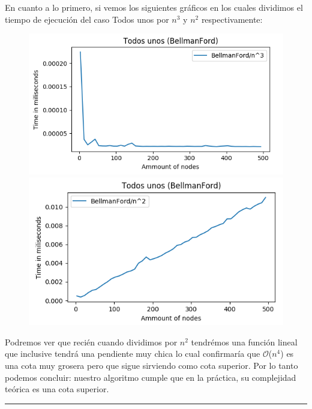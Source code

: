 \documentclass[11pt,a4paper]{article}
\begin{document}
En cuanto a lo primero, si vemos los siguientes gr\'aficos en los cuales dividimos el tiempo de ejecuci\'on del caso Todos unos por $n^{3}$ y $n^{2}$ respectivamente:

\centering
\begin{figure}[h]
		\includegraphics[scale=0.5]{BF3-unos.png}
    	\includegraphics[scale=0.5]{BF2-unos.png}
\end{figure}

Podremos ver que reci\'en cuando dividimos por $n^{2}$ tendr\'emos una funci\'on lineal que inclusive tendr\'a una pendiente muy chica lo cual confirmar\'ia que $\mathcal{O}$($n^{4}$) es una cota muy grosera pero que sigue sirviendo como cota superior.
Por lo tanto podemos concluir: nuestro algoritmo cumple que en la pr\'actica, su complejidad te\'orica es una cota superior.
\\
\begin{center}
  \rule{100mm}{0.1mm}  
\end{center}
\end{document}
